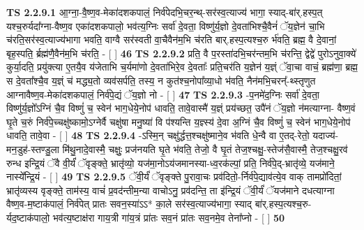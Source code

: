 \documentclass[17pt]{extarticle}
\begin{document}
                                        \textbf{ TS 2.2.9.1} \newline
                  आ॒ग्ना॒-वै॒ष्ण॒व-मेका॑दशकपालं॒ निर्व॑पेदभि॒चर॒न्थ्-सर॑स्व॒त्याज्य॑ भागा॒ स्याद्-बा॑र्.हस्प॒त् यश्च॒रुर्यदा᳚ग्ना-वैष्ण॒व एका॑दशकपालो॒ भव॑त्य॒ग्निः सर्वा॑ दे॒वता॒ विष्णु॑र्य॒ज्ञो दे॒वता॑भिश्चै॒वैनं॑ ॅय॒ज्ञेन॑ चा॒भि च॑रति॒सर॑स्व॒त्याज्य॑भागा भवति॒ वाग्वै सर॑स्वती वा॒चैवैन॑म॒भि च॑रति बार्.हस्प॒त्यश्च॒रु र्भ॑वति॒ ब्रह्म॒ वै दे॒वानां॒ बृह॒स्पति॒ र्ब्रह्म॑णै॒वैन॑म॒भि च॑रति॒ - [  ] \textbf{  46} \newline
                  \newline
                                \textbf{ TS 2.2.9.2} \newline
                  प्रति॒ वै प॒रस्ता॑दभि॒चर॑न्तम॒भि च॑रन्ति॒ द्वेद्वे॑ पुरोऽनुवा॒क्ये॑ कुर्या॒दति॒ प्रयु॑क्त्या ए॒तयै॒व य॑जेताभि च॒र्यमा॑णो दे॒वता॑भिरे॒व दे॒वताः᳚ प्रति॒चर॑ति य॒ज्ञेन॑ य॒ज्ञ्ं ॅवा॒चा वाचं॒ ब्रह्म॑णा॒ ब्रह्म॒ स दे॒वता᳚श्चै॒व य॒ज्ञ्ं च॑ मद्ध्य॒तो व्यव॑सर्पति॒ तस्य॒ न कुत॑श्च॒नोपा᳚व्या॒धो भ॑वति॒ नैन॑मभि॒चरन्᳚-थ्स्तृणुत आग्नावैष्ण॒व-मेका॑दशकपालं॒ निर्व॑पे॒द्यं ॅय॒ज्ञो नो - [  ] \textbf{  47} \newline
                  \newline
                                \textbf{ TS 2.2.9.3} \newline
                  -प॒नमे॑द॒ग्निः सर्वा॑ दे॒वता॒ विष्णु॑र्य॒ज्ञो᳚ऽग्निं चै॒व विष्णुं॑ च॒ स्वेन॑ भाग॒धेये॒नोप॑ धावति॒ तावे॒वास्मै॑ य॒ज्ञ्ं प्रय॑च्छत॒ उपै॑नं ॅय॒ज्ञो न॑मत्याग्ना- वैष्ण॒वं घृ॒ते च॒रुं निर्व॑पे॒च्चक्षु॑ष्कामो॒ऽग्नेर्वै चक्षु॑षा मनु॒ष्या॑ वि प॑श्यन्ति य॒ज्ञ्स्य॑ दे॒वा अ॒ग्निं चै॒व विष्णुं॑ च॒ स्वेन॑ भाग॒धेये॒नोप॑ धावति॒ तावे॒वा - [  ] \textbf{  48} \newline
                  \newline
                                \textbf{ TS 2.2.9.4} \newline
                  -ऽस्मि॒न् चक्षु॑र्द्धत्त॒श्चक्षु॑ष्माने॒व भ॑वति धे॒न्वै वा ए॒तद्-रेतो॒ यदाज्य॑-मन॒डुह॑-स्तण्डु॒ला मि॑थु॒नादे॒वास्मै॒ चक्षुः॒ प्रज॑नयति घृ॒ते भ॑वति॒ तेजो॒ वै घृ॒तं तेज॒श्चक्षु॒-स्तेज॑सै॒वास्मै॒ तेज॒श्चक्षु॒रव॑ रुन्ध इन्द्रि॒यं ॅवै वी॒र्यं॑ ॅवृङ्क्ते॒ भ्रातृ॑व्यो॒ यज॑मा॒नोऽय॑जमानस्या-ध्व॒रक॑ल्पां॒ प्रति॒ निर्व॑पे॒द्-भ्रातृ॑व्ये॒ यज॑माने॒ नास्ये᳚न्द्रि॒यं - [  ] \textbf{  49} \newline
                  \newline
                                \textbf{ TS 2.2.9.5} \newline
                  ॅवी॒र्यं॑ ॅवृङ्क्ते पु॒रावा॒चः प्रव॑दितो॒-र्निर्व॑पे॒द्याव॑त्ये॒व वाक् तामप्रो॑दितां॒ भ्रातृ॑व्यस्य वृङ्क्ते॒ ताम॑स्य॒ वाचं॑ प्र॒वद॑न्तीम॒न्या वाचोऽनु॒ प्रव॑दन्ति॒ ता इ॑न्द्रि॒यं ॅवी॒र्यं॑ ॅयज॑माने दधत्याग्ना वैष्ण॒व-म॒ष्टाक॑पालं॒ निर्व॑पेत् प्रातः सवन॒स्या॑ऽऽ* का॒ले सर॑स्व॒त्याज्य॑भागा॒ स्याद् बा॑र्.हस्प॒त्यश्च॒रु- र्यद॒ष्टाक॑पालो॒ भव॑त्य॒ष्टाक्ष॑रा गाय॒त्री गा॑य॒त्रं प्रा॑तः सव॒नं प्रा॑तः सव॒नमे॒व तेना᳚प्नो - [  ] \textbf{  50} \newline
\end{document}
